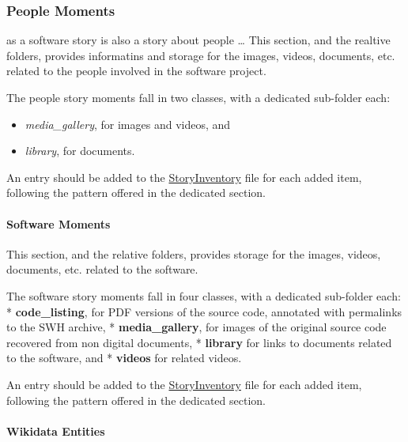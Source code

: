 \documentclass[]{article}
\providecommand{\tightlist}{%
  \setlength{\itemsep}{0pt}\setlength{\parskip}{0pt}}
\begin{document}
\hypertarget{people-moments}{%
\subsubsection{People Moments}\label{people-moments}}

as a software story is also a story about people \ldots{} This section,
and the realtive folders, provides informatins and storage for the
images, videos, documents, etc. related to the people involved in the
software project.

The people story moments fall in two classes, with a dedicated
sub-folder each:

\begin{itemize}
\tightlist
\item
  \emph{media\_gallery}, for images and videos, and
\item
  \emph{library}, for documents.
\end{itemize}

An entry should be added to the
\href{https://github.com/Unipisa/Softi-Workbench/blob/structure_review/additional-materials/swh_stories_workplace/StoryInventory.md}{StoryInventory}
file for each added item, following the pattern offered in the dedicated
section.

\hypertarget{software-moments}{%
\paragraph{Software Moments}\label{software-moments}}

This section, and the relative folders, provides storage for the images,
videos, documents, etc. related to the software.

The software story moments fall in four classes, with a dedicated
sub-folder each: * \textbf{code\_listing}, for PDF versions of the
source code, annotated with permalinks to the SWH archive, *
\textbf{media\_gallery}, for images of the original source code
recovered from non digital documents, * \textbf{library} for links to
documents related to the software, and * \textbf{videos} for related
videos.

An entry should be added to the
\href{https://github.com/Unipisa/Softi-Workbench/blob/structure_review/additional-materials/swh_stories_workplace/StoryInventory.md}{StoryInventory}
file for each added item, following the pattern offered in the dedicated
section.

\hypertarget{wikidata-entities}{%
\paragraph{Wikidata Entities}\label{wikidata-entities}}
\end{document}

